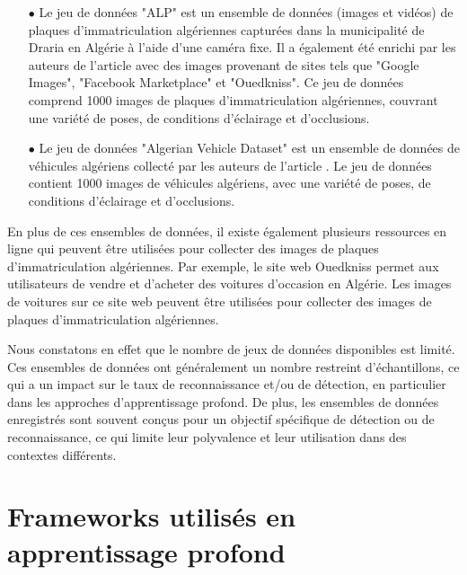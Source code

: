 \begin{itemize}
    \item [$\bullet$] Le jeu de données "ALP" \cite{license-dataset} est un ensemble de données (images et vidéos) de plaques d'immatriculation algériennes capturées dans la municipalité de Draria en Algérie à l'aide d'une caméra fixe. 
    Il a également été enrichi par les auteurs de l'article \cite{bens} avec des images provenant de sites tels que "Google Images", "Facebook Marketplace" et "Ouedkniss". Ce jeu de données comprend 1000 images de plaques d'immatriculation algériennes, couvrant une variété de poses, de conditions d'éclairage et d'occlusions.   
    \item [$\bullet$] Le jeu de données "Algerian Vehicle Dataset" est un ensemble de données de véhicules algériens collecté par les auteurs de l'article \cite{zibani}. Le jeu de données contient 1000 images de véhicules algériens, avec une variété de poses, de conditions d'éclairage et d'occlusions.
\end{itemize}
En plus de ces ensembles de données, il existe également plusieurs ressources en ligne qui peuvent être utilisées pour collecter des images de plaques d'immatriculation algériennes. Par exemple, le site web Ouedkniss permet aux utilisateurs de vendre et d'acheter des voitures d'occasion en Algérie. Les images de voitures sur ce site web peuvent être utilisées pour collecter des images de plaques d'immatriculation algériennes.

Nous constatons en effet que le nombre de jeux de données disponibles est limité. Ces ensembles de données ont généralement un nombre restreint d'échantillons, ce qui a un impact sur le taux de reconnaissance et/ou de détection, en particulier dans les approches d'apprentissage profond. De plus, les ensembles de données enregistrés sont souvent conçus pour un objectif spécifique de détection ou de reconnaissance, ce qui limite leur polyvalence et leur utilisation dans des contextes différents.

\section{Frameworks utilisés en apprentissage profond}

